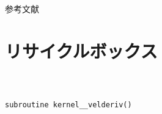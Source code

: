 \documentclass[dvipdfmx,cjk]{beamer}
\begin{document}
\begin{frame}[allowframebreaks]{参考文献}{}
  
  
\end{frame}



% 
% 
% 








\section*{リサイクルボックス}




\subsection{}
\begin{frame}\frametitle{}
\begin{eqnarray}
\end{eqnarray}
\end{frame}


\begin{frame}[fragile]\frametitle{}
\begingroup \fontsize{8pt}{9pt}\selectfont
\begin{verbatim}
subroutine kernel__velderiv()
\end{verbatim}
\endgroup
\end{frame}
\end{document}
